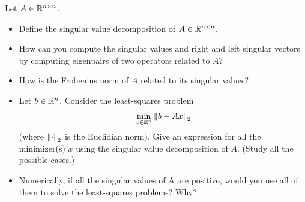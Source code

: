 \documentclass[10pt]{article}
\begin{document}
\maketitle

\begin{problem}
Let \( A\in\mathbb{R}^{n\times n} \).
\begin{itemize}[nolistsep]
    \item Define the singular value decomposition of \( A\in\mathbb{R}^{n\times n} \).
    \item How can you compute the singular values and right and left singular vectors by computing eigenpairs of two operators related to \( A \)?
    \item How is the Frobenius norm of \( A \) related to its singular values?
    \item Let \( b\in \mathbb{R}^n \). Consider the least-squares problem
    \begin{align*}
        \min_{x\in\mathbb{R}^n} \left\lVert b-Ax\right\rVert_2
    \end{align*}
    (where \( \left\lVert\cdot\right\rVert_2 \) is the Euclidian norm). Give an expression for all the minimizer(s) \( x \) using the singular value decomposition of \( A \). (Study all the possible cases.)
        \item Numerically, if all the singular values of A are positive, would you use all of them to solve the least-squares problems? Why?
\end{itemize}
\end{problem}
\end{document}
